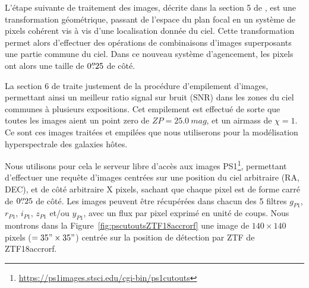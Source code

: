 \documentclass[../main/main.tex]{subfiles}
\begin{document}
L'étape suivante de traitement des images, décrite dans la section 5 de
\citet{Waters2020}, est une transformation géométrique, passant de l'espace du
plan focal en un système de pixels cohérent vis à vis d'une localisation donnée
du ciel. Cette transformation permet alors d'effectuer des opérations de
combinaisons d'images superposants une partie commune du ciel. Dans ce
nouveau système d'agencement, les pixels ont alors une taille de
$0\overset{\prime\prime}{.}25$ de côté.


La section 6 de \citet{Waters2020} traite justement de la procédure
d'empilement d'images, permettant ainsi un meilleur ratio signal sur
bruit (SNR) dans les zones du ciel communes à plusieurs expositions. Cet
empilement est effectué de sorte que toutes les images aient un point
zero de $ZP=\SI{25.0}{mag}$, et un airmass de $\chi=1$. Ce
sont ces images traitées et empilées que nous utiliserons pour la
modélisation hyperspectrale des galaxies hôtes.


Nous utilisons pour cela le serveur libre d'accès aux images
PS1\footnote{\url{https://ps1images.stsci.edu/cgi-bin/ps1cutouts}},
permettant d'effectuer une requête d'images centrées sur une position du
ciel arbitraire (RA, DEC), et de côté arbitraire X pixels, sachant que chaque pixel
est de forme carré de $0\overset{\prime\prime}{.}25$ de côté. Les images peuvent être
récupérées dans chacun des 5 filtres $g_{P1}$, $r_{P1}$, $i_{P1}$,
$z_{P1}$ et/ou $y_{P1}$, avec un flux par pixel exprimé en unité de coups. Nous montrons dans la
Figure~\ref{fig:pscutoutsZTF18accrorf} une image de $140\times140$
pixels ($=35"\times35"$) centrée sur la position de détection par ZTF de
ZTF18accrorf. 
\end{document}
